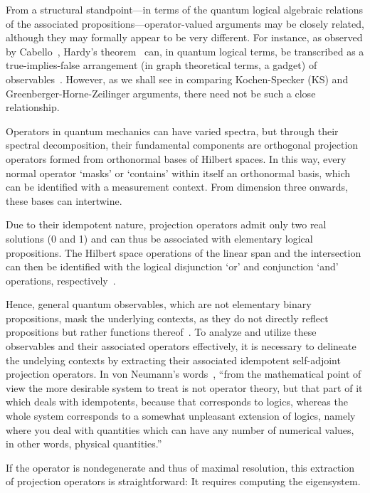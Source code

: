 \documentclass[
  twocolumn,
 showpacs,
 showkeys,
 preprintnumbers,
 amsmath,amssymb,
 aps,
 pra,
  longbibliography,
 floatfix,
 ]{revtex4-2}
\begin{document}
From a structural standpoint---in terms of the quantum logical algebraic relations of the associated propositions---operator-valued arguments may be closely related, although they may formally appear to be very different. For instance, as observed by Cabello~\cite{cabello-96,Cabello-2013-Hardylike}, Hardy's theorem~\cite{Hardy-92,Hardy-93} can, in quantum logical terms, be transcribed as a true-implies-false arrangement (in graph theoretical terms, a gadget) of observables~\cite{2018-minimalYIYS,svozil-2020-hardy}.
However, as we shall see in comparing Kochen-Specker (KS) and Greenberger-Horne-Zeilinger arguments, there need not be such a close relationship.


Operators in quantum mechanics can have varied spectra, but through their spectral decomposition,
their fundamental components are orthogonal projection operators formed from orthonormal bases of Hilbert spaces.
In this way, every normal operator `masks' or `contains' within itself an orthonormal basis, which
can be identified with a measurement context. From dimension three onwards, these bases can intertwine.

Due to their idempotent nature, projection operators admit only two real solutions (0 and 1) and can thus be associated with elementary logical propositions. The Hilbert space operations of the linear span and the intersection can then be identified with the logical disjunction `or' and conjunction `and' operations, respectively~\cite{birkhoff-36,vonNeumann2018Feb}.

Hence, general quantum observables, which are not elementary binary propositions,
mask the underlying contexts, as they do not directly reflect propositions but rather functions thereof~\cite[\S~82]{halmos-vs}.
To analyze and utilize these observables and their associated operators effectively,
it is necessary to delineate the undelying contexts by extracting their associated idempotent self-adjoint projection operators.
In von Neumann's words~\cite[pp.~241, 242]{vonNeumann2001},
``from the mathematical point of view the more desirable system to treat is not operator theory,
but that part of it which deals with idempotents, because that corresponds to logics,
whereas the whole system corresponds to a somewhat unpleasant extension
of logics, namely where you deal with quantities which can have any number of numerical values,
in other words, physical quantities.''

If the operator is nondegenerate and thus of maximal resolution, this extraction of projection operators is straightforward: It requires computing the eigensystem.
\end{document}
